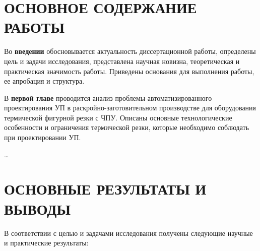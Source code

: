 \documentclass[14pt]{extarticle}
\begin{document}
\section*{ОСНОВНОЕ СОДЕРЖАНИЕ РАБОТЫ}
Во {\bf введении} 
обосновывается актуальность диссертационной работы, 
определены цель и задачи исследования, 
представлена научная новизна, теоретическая и практическая значимость работы. 
Приведены основания для выполнения работы, ее апробация и структура.

В {\bf первой главе} 
проводится анализ проблемы автоматизированного проектирования УП 
в раскройно-заготовительном производстве для оборудования термической фигурной резки с ЧПУ. 
Описаны основные технологические особенности и ограничения термической резки, 
которые необходимо соблюдать при проектировании УП.

\dots

\section*{ОСНОВНЫЕ РЕЗУЛЬТАТЫ И ВЫВОДЫ}
В соответствии с целью и задачами исследования получены следующие
научные и практические результаты:
\end{document}
